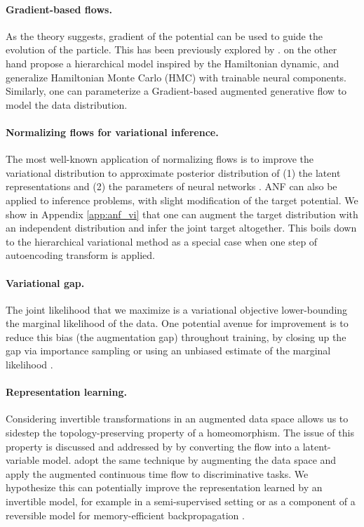 \documentclass{article}
\begin{document}
\paragraph{Gradient-based flows.}
As the theory suggests, gradient of the potential can be used to guide the evolution of the particle.
This has been previously explored by \citet{duvenaud2016early}. 
\citet{salimans2015markov} on the other hand propose a hierarchical model inspired by the Hamiltonian dynamic, and \citet{song2017nice,levy2017generalizing} generalize Hamiltonian Monte Carlo (HMC) with trainable neural components. 
Similarly, one can parameterize a Gradient-based augmented generative flow to model the data distribution.


\paragraph{Normalizing flows for variational inference.}
The most well-known application of normalizing flows is to improve the variational distribution to approximate posterior distribution of (1) the latent representations \citep{rezende2015variational, kingma2016improved,tomczak2016improving,berg2018sylvester} and (2) the parameters of neural networks \citep{louizos2017multiplicative, krueger2017bayesian, huang2019stochastic}. 
ANF can also be applied to inference problems, with slight modification of the target potential. 
We show in Appendix \ref{app:anf_vi} that one can augment the target distribution with an independent distribution and infer the joint target altogether.
This boils down to the hierarchical variational method \citep{agakov2004auxiliary,ranganath2016hierarchical} as a special case when one step of autoencoding transform is applied. 

\paragraph{Variational gap.}
The joint likelihood that we maximize is a variational objective lower-bounding the marginal likelihood of the data. 
One potential avenue for improvement is to reduce this bias (the augmentation gap) throughout training, by closing up the gap via importance sampling \citep{burda2015importance} or using an unbiased estimate of the marginal likelihood \citep{luo2020sumo}.

\paragraph{Representation learning.}
Considering invertible transformations in an augmented data space allows us to sidestep the topology-preserving property of a homeomorphism. 
The issue of this property is discussed and addressed by \citet{cornish2019localised} by converting the flow into a latent-variable model. 
\citet{dupont2019augmented} adopt the same technique by augmenting the data space and apply the augmented continuous time flow to discriminative tasks. 
We hypothesize this can potentially improve the representation learned by an invertible model, for example in a semi-supervised setting \citep{nalisnick2019hybrid,atanov2019semi} or as a component of a reversible model for memory-efficient backpropagation \citep{gomez2017reversible}. 
\end{document}

